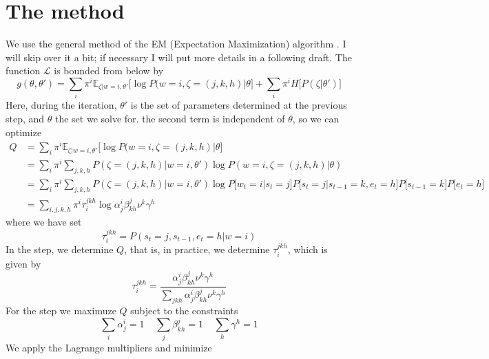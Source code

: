 \documentclass[10pt]{article}
\def\textbf{\pmb}
\def\st{s}
\def\ev{e}
\begin{document}
\section{The method}
We use the general method of the EM (Expectation Maximization)
algorithm \cite{dempster:77}. I will skip over it a bit; if necessary I will put more
details in a following draft. The function ${\mathcal{L}}$ is bounded
from below by
%
%
\begin{equation}
  g(\theta,\theta') = 
  \sum_i \pi^i {\mathbb{E}}_{\zeta|w=i,\theta'}\bigl[\log P(w=i,\zeta=(j,k,h)|\theta\bigr] + \sum_i \pi^i H\bigl[P(\zeta|\theta')]
\end{equation}
%
%
Here, during the iteration, $\theta'$ is the set of parameters
determined at the previous step, and $\theta$ the set we solve
for. the second term is independent of $\theta$, so we can optimize
%
%
\begin{equation}
  \begin{aligned}
    Q &= \sum_i \pi^i {\mathbb{E}}_{\zeta|w=i,\theta'}\bigl[\log P(w=i,\zeta=(j,k,h)|\theta\bigr] \\
    &= \sum_i \pi^i \sum_{j,k,h} P(\zeta=(j,k,h)|w=i, \theta') \log P(w=i,\zeta=(j,k,h)|\theta) \\
    &= \sum_i \pi^i  \sum_{j,k,h} P(\zeta=(j,k,h)|w=i, \theta') \log P\bigl[w_t=i\bigl|\st_t=j\bigr]P\bigl[\st_t=j\bigl|\st_{t-1}=k,\ev_t=h\bigr]P\bigl[\st_{t-1}=k\bigr]P\bigl[\ev_t=h\bigr] \\
    &= \sum_{i,j,k,h} \pi^i \tau_i^{jkh} \log \alpha_j^i \beta_{kh}^j \nu^k \gamma^h
  \end{aligned}
\end{equation}
%
%
where we have set 
%
%
\begin{equation}
  \tau_i^{jkh} = P(\st_t=j, \st_{t-1}, \ev_t=h | w=i)
\end{equation}
%
%
In the \textbf{E} step, we determine $Q$, that is, in practice, we
determine $\tau_i^{jkh}$, which is given by
%
%
\begin{equation}
  \label{eeq}
  \tau_i^{jkh} = \frac{\alpha_j^i \beta_{kh}^j \nu^k \gamma^h}
                     {\displaystyle \sum_{jkh} \alpha_j^i \beta_{kh}^j \nu^k \gamma^h}
\end{equation}
%
%
For the \textbf{M} step we maximuze $Q$ subject to the constraints
%
%
\begin{equation}
  \sum_i \alpha_j^i = 1\ \ \ \ \ \sum_j \beta_{kh}^j = 1\ \ \ \ \ \sum_h \gamma^h = 1
\end{equation}
%
%
We apply the Lagrange multipliers and minimize
\end{document}
